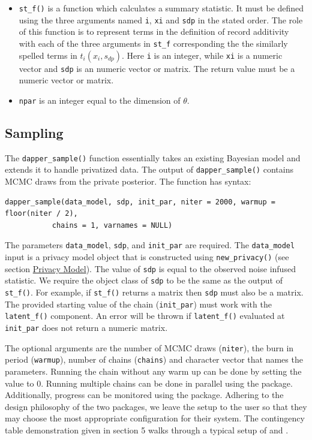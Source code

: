 \begin{itemize}
  Finally, the return value of \texttt{priv\_f()} must be a scalar value.
\item
  \texttt{st\_f()} is a function which calculates a summary statistic. It
  must be defined using the three arguments named \texttt{i}, \texttt{xi} and \texttt{sdp}
  in the stated order. The role of this function is to represent terms in the definition of record additivity
  with each of the three arguments in \texttt{st\_f} corresponding the the similarly spelled
  terms in \(t_i(x_i, s_{dp})\). Here \texttt{i} is an integer,
  while \texttt{xi} is a numeric vector and \texttt{sdp} is an numeric vector or matrix. The return value
  must be a numeric vector or matrix.
\item
  \texttt{npar} is an integer equal to the dimension of \(\theta\).
\end{itemize}

\hypertarget{sampling}{%
\subsection{Sampling}\label{sampling}}

The \texttt{dapper\_sample()} function essentially takes an existing
Bayesian model and extends it to handle privatized data. The
output of \texttt{dapper\_sample()} contains MCMC draws from
the private posterior. The function has syntax:

\begin{verbatim}
dapper_sample(data_model, sdp, init_par, niter = 2000, warmup = floor(niter / 2),
           chains = 1, varnames = NULL)
\end{verbatim}

The parameters \texttt{data\_model}, \texttt{sdp}, and \texttt{init\_par} are required.
The \texttt{data\_model} input is a privacy model object that is constructed
using \texttt{new\_privacy()} (see section \protect\hyperlink{privacy-model}{Privacy Model}). The value
of \texttt{sdp} is equal to the observed noise infused statistic. We require the
object class of \texttt{sdp} to be the same as the output of \texttt{st\_f()}.
For example, if \texttt{st\_f()} returns a matrix
then \texttt{sdp} must also be a matrix. The provided starting value of the
chain (\texttt{init\_par}) must work with the \texttt{latent\_f()} component. An
error will be thrown if \texttt{latent\_f()} evaluated at \texttt{init\_par} does
not return a numeric matrix.

The optional arguments are the number of MCMC draws (\texttt{niter}), the
burn in period (\texttt{warmup}), number of chains (\texttt{chains}) and character
vector that names the parameters. Running the chain without
any warm up can be done by setting the value to 0. Running multiple chains can be done in parallel
using the  package. Additionally, progress can be monitored
using the  package. Adhering to the design philosophy
of the two packages, we leave the setup to the user so that they may
choose the most appropriate configuration for their system. The
contingency table demonstration given in section 5 walks
through a typical setup of  and .

